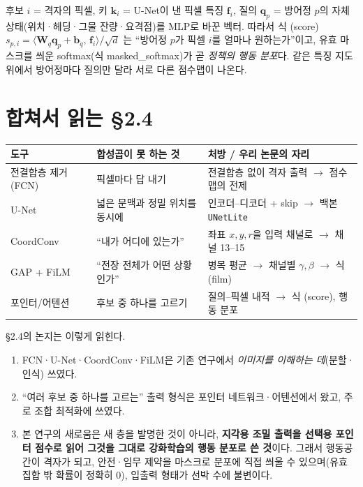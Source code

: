 \documentclass[11pt]{article}
\begin{document}
\begin{whybox}
후보 $i$ = 격자의 픽셀, 키 $\mathbf{k}_i$ = U-Net이 낸 픽셀 특징 $\mathbf{f}_i$, 질의 $\mathbf{q}_p$ = 방어정 $p$의
자체 상태(위치·헤딩·그물 잔량·요격점)를 MLP로 바꾼 벡터. 따라서 식 (score)
$s_{p,i} = \langle \mathbf{W}_q\mathbf{q}_p + \mathbf{b}_q,\, \mathbf{f}_i\rangle / \sqrt{d}$ 는 ``방어정 $p$가 픽셀 $i$를
얼마나 원하는가''이고, 유효 마스크를 씌운 softmax(식 masked\_softmax)가 곧 \emph{정책의 행동 분포}다.
같은 특징 지도 위에서 방어정마다 질의만 달라 서로 다른 점수맵이 나온다.
\end{whybox}

\section{합쳐서 읽는 §2.4}

\begin{center}
\small
\begin{tabular}{@{}p{28mm}p{48mm}p{62mm}@{}}
\toprule
도구 & 합성곱이 못 하는 것 & 처방 / 우리 논문의 자리 \\
\midrule
전결합층 제거(FCN) & 픽셀마다 답 내기 & 전결합층 없이 격자 출력 $\to$ 점수맵의 전제 \\
U-Net & 넓은 문맥과 정밀 위치를 동시에 & 인코더--디코더 + skip $\to$ 백본 \texttt{UNetLite} \\
CoordConv & ``내가 어디에 있는가'' & 좌표 $x, y, r$을 입력 채널로 $\to$ 채널 13--15 \\
GAP + FiLM & ``전장 전체가 어떤 상황인가'' & 병목 평균 $\to$ 채널별 $\gamma, \beta$ $\to$ 식 (film) \\
포인터/어텐션 & 후보 중 하나를 고르기 & 질의--픽셀 내적 $\to$ 식 (score), 행동 분포 \\
\bottomrule
\end{tabular}
\end{center}

§2.4의 논지는 이렇게 읽힌다.

\begin{enumerate}[leftmargin=*, itemsep=3pt]
\item FCN·U-Net·CoordConv·FiLM은 기존 연구에서 \emph{이미지를 이해하는 데}(분할·인식) 쓰였다.
\item ``여러 후보 중 하나를 고르는'' 출력 형식은 포인터 네트워크·어텐션에서 왔고, 주로 조합 최적화에 쓰였다.
\item 본 연구의 새로움은 새 층을 발명한 것이 아니라, \textbf{지각용 조밀 출력을 선택용 포인터 점수로 읽어
      그것을 그대로 강화학습의 행동 분포로 쓴 것}이다. 그래서 행동공간이 격자가 되고, 안전·임무 제약을
      마스크로 분포에 직접 씌울 수 있으며(유효 집합 밖 확률이 정확히 0), 입출력 형태가 선박 수에 불변이다.
\end{enumerate}
\end{document}
